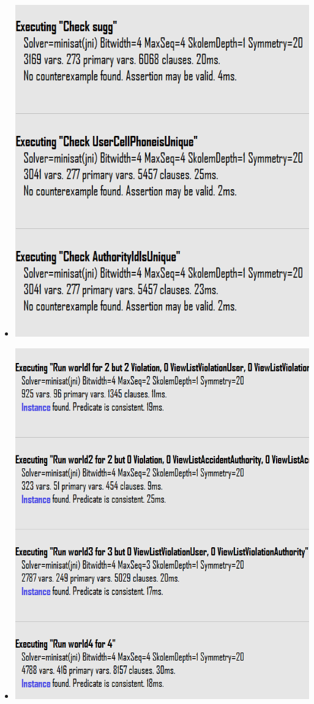 \begin{itemize}\centering
\item \includegraphics[scale=1.1]{Images/AlloyWorlds/ExecutingChecks.PNG}
\item \includegraphics[scale=1]{Images/AlloyWorlds/ExecutingPredicates.PNG}
\end{itemize}
